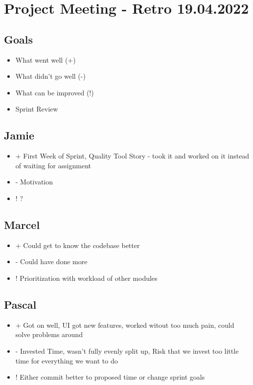 \section{Project Meeting - Retro 19.04.2022}

\subsection{Goals}
\begin{itemize}
    \item What went well (+)
    \item What didn't go well (-)
    \item What can be improved (!)
    \item Sprint Review
\end{itemize}

\subsection{Jamie}
\begin{itemize}
    \item + First Week of Sprint, Quality Tool Story - took it and worked on it instead of waiting for assignment
    \item - Motivation
    \item ! ?
\end{itemize}

\subsection{Marcel}
\begin{itemize}
    \item + Could get to know the codebase better
    \item - Could have done more
    \item ! Prioritization with workload of other modules
\end{itemize}

\subsection{Pascal}
\begin{itemize}
    \item + Got on well, UI got new features, worked witout too much pain, could solve problems around
    \item - Invested Time, wasn't fully evenly split up, Risk that we invest too little time for everything we want to do
    \item ! Either commit better to proposed time or change sprint goals
\end{itemize}

